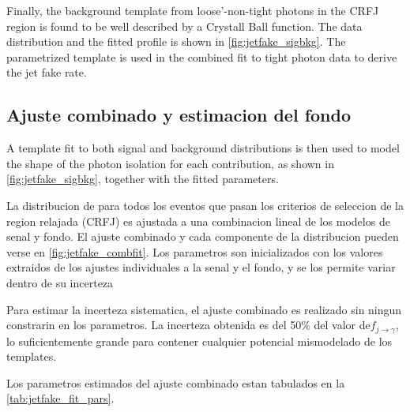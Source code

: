 Finally, the background template from loose'-non-tight photons in the CRFJ region is found
to be well described by a Crystall Ball function. The data distribution and the fitted profile
is shown in \cref{fig:jetfake_sigbkg}. The parametrized template is used in the combined
fit to tight photon data to derive the jet fake rate.


\subsection{Ajuste combinado y estimacion del fondo} \label{sec:jet_fake_results}

A template fit to both signal and background distributions is then used to model the shape of the photon isolation
for each contribution, as shown in \cref{fig:jetfake_sigbkg}, together with the fitted parameters.

La distribucion de {\etiso} para todos los eventos que pasan los criterios
de seleccion de la region relajada (CRFJ) es ajustada a una combinacion
lineal de los modelos de senal y fondo. El ajuste combinado y cada componente
de la distribucion pueden verse en \cref{fig:jetfake_combfit}.
Los parametros son inicializados con los valores extraidos de los ajustes
individuales a la senal y el fondo, y se los permite variar dentro de su
incerteza

Para estimar la incerteza sistematica, el ajuste combinado es realizado
sin ningun constrarin en los parametros. La incerteza obtenida es del
50\% del valor de$f_{j\to\gamma}$, lo suficientemente grande para contener
cualquier potencial mismodelado de los templates.

Los parametros estimados del ajuste combinado estan tabulados en la
\cref{tab:jetfake_fit_pars}.

